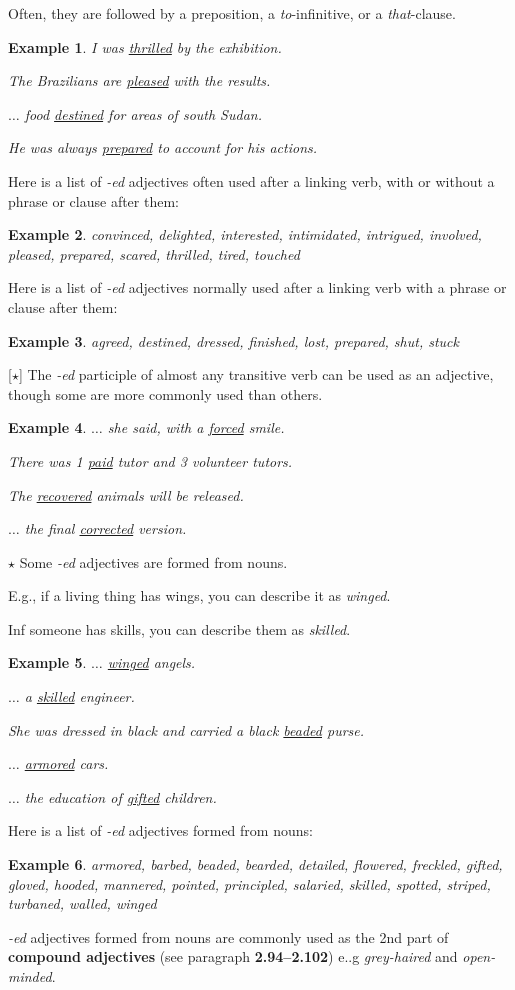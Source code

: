 \documentclass[oneside]{book}
\numberwithin{equation}{section}
\newtheorem{example}{Example}[section]
\begin{document}
Often, they are followed by a preposition, a \textit{to}-infinitive, or a \textit{that}-clause.
\begin{example}
    I was \underline{thrilled} by the exhibition.
    
    The Brazilians are \underline{pleased} with the results.
    
    $\ldots$ food \underline{destined} for areas of south Sudan.
    
    He was always \underline{prepared} to account for his actions.
\end{example}
Here is a list of \textit{-ed} adjectives often used after a linking verb, with or without a phrase or clause after them:
\begin{example}
    convinced, delighted, interested, intimidated, intrigued, involved, pleased, prepared, scared, thrilled, tired, touched
\end{example}
Here is a list of \textit{-ed} adjectives normally used after a linking verb with a phrase or clause after them:
\begin{example}
    agreed, destined, dressed, finished, lost, prepared, shut, stuck
\end{example}
%
\noindent{} [$\star$] The \textit{-ed} participle of almost any transitive verb can be used as an adjective, though some are more commonly used than others.
\begin{example}
    $\ldots$ she said, with a \underline{forced} smile.
    
    There was 1 \underline{paid} tutor and 3 volunteer tutors.
    
    The \underline{recovered} animals will be released.
    
    $\ldots$ the final \underline{corrected} version.
\end{example}
%
\noindent{} $\star$ Some \textit{-ed} adjectives are formed from nouns.

E.g., if a living thing has wings, you can describe it as \textit{winged}.

Inf someone has skills, you can describe them as \textit{skilled}.
\begin{example}
    $\ldots$ \underline{winged} angels.
    
    $\ldots$ a \underline{skilled} engineer.
    
    She was dressed in black and carried a black \underline{beaded} purse.
    
    $\ldots$ \underline{armored} cars.
    
    $\ldots$ the education of \underline{gifted} children.
\end{example}
%
\noindent{} Here is a list of \textit{-ed} adjectives formed from nouns:
\begin{example}
    armored, barbed, beaded, bearded, detailed, flowered, freckled, gifted, gloved, hooded, mannered, pointed, principled, salaried, skilled, spotted, striped, turbaned, walled, winged
\end{example}
\textit{-ed} adjectives formed from nouns are commonly used as the 2nd part of \textbf{compound adjectives} (see paragraph \textbf{2.94--2.102}) e..g \textit{grey-haired} and \textit{open-minded}.
\end{document}
